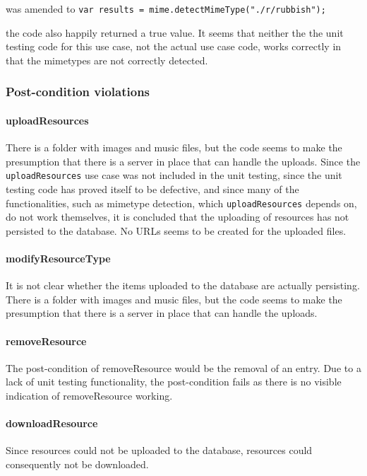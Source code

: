 \documentclass[a4paper]{article}
\begin{document}
was amended to \texttt{var results = mime.detectMimeType("./r/rubbish");}

the code also happily returned a true value. It seems that neither the the unit testing code for this use case, not the actual use case code, works correctly in that the mimetypes are not correctly detected.

\subsubsection {Post-condition violations}

\paragraph{uploadResources}
There is a folder with images and music files, but the code seems to make the presumption that there is a server in place that can handle the uploads. Since the \texttt{uploadResources} use case was not included in the unit testing, since the unit testing code has proved itself to be defective, and since many of the functionalities, such as mimetype detection, which \texttt{uploadResources} depends on, do not work themselves, it is concluded that the uploading of resources has not persisted to the database. No URLs seems to be created for the uploaded files. 

\paragraph{modifyResourceType}
It is not clear whether the items uploaded to the database are actually persisting. There is a folder with images and music files, but the code seems to make the presumption that there is a server in place that can handle the uploads.

\paragraph{removeResource}
The post-condition of removeResource would be the removal of an entry. Due to a lack of unit testing functionality, the post-condition fails as there is no visible indication of removeResource working.

\paragraph{downloadResource}
Since resources could not be uploaded to the database, resources could consequently not be downloaded.
\end{document}

